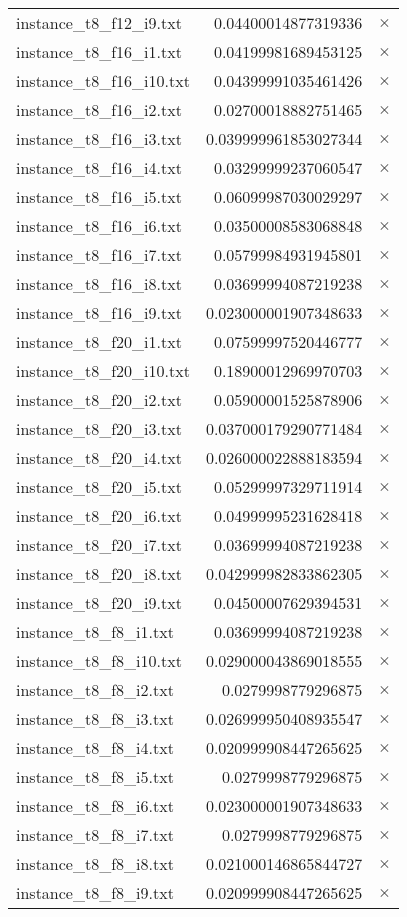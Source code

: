 \documentclass{article}
\begin{document}
\begin{center}
\begin{tabular}{|l|rr|}
instance\_t8\_f12\_i9.txt & 0.04400014877319336 & $\times$ \\
instance\_t8\_f16\_i1.txt & 0.04199981689453125 & $\times$ \\
instance\_t8\_f16\_i10.txt & 0.04399991035461426 & $\times$ \\
instance\_t8\_f16\_i2.txt & 0.02700018882751465 & $\times$ \\
instance\_t8\_f16\_i3.txt & 0.039999961853027344 & $\times$ \\
instance\_t8\_f16\_i4.txt & 0.03299999237060547 & $\times$ \\
instance\_t8\_f16\_i5.txt & 0.06099987030029297 & $\times$ \\
instance\_t8\_f16\_i6.txt & 0.03500008583068848 & $\times$ \\
instance\_t8\_f16\_i7.txt & 0.05799984931945801 & $\times$ \\
instance\_t8\_f16\_i8.txt & 0.03699994087219238 & $\times$ \\
instance\_t8\_f16\_i9.txt & 0.023000001907348633 & $\times$ \\
instance\_t8\_f20\_i1.txt & 0.07599997520446777 & $\times$ \\
instance\_t8\_f20\_i10.txt & 0.18900012969970703 & $\times$ \\
instance\_t8\_f20\_i2.txt & 0.05900001525878906 & $\times$ \\
instance\_t8\_f20\_i3.txt & 0.037000179290771484 & $\times$ \\
instance\_t8\_f20\_i4.txt & 0.026000022888183594 & $\times$ \\
instance\_t8\_f20\_i5.txt & 0.05299997329711914 & $\times$ \\
instance\_t8\_f20\_i6.txt & 0.04999995231628418 & $\times$ \\
instance\_t8\_f20\_i7.txt & 0.03699994087219238 & $\times$ \\
instance\_t8\_f20\_i8.txt & 0.042999982833862305 & $\times$ \\
instance\_t8\_f20\_i9.txt & 0.04500007629394531 & $\times$ \\
instance\_t8\_f8\_i1.txt & 0.03699994087219238 & $\times$ \\
instance\_t8\_f8\_i10.txt & 0.029000043869018555 & $\times$ \\
instance\_t8\_f8\_i2.txt & 0.0279998779296875 & $\times$ \\
instance\_t8\_f8\_i3.txt & 0.026999950408935547 & $\times$ \\
instance\_t8\_f8\_i4.txt & 0.020999908447265625 & $\times$ \\
instance\_t8\_f8\_i5.txt & 0.0279998779296875 & $\times$ \\
instance\_t8\_f8\_i6.txt & 0.023000001907348633 & $\times$ \\
instance\_t8\_f8\_i7.txt & 0.0279998779296875 & $\times$ \\
instance\_t8\_f8\_i8.txt & 0.021000146865844727 & $\times$ \\
instance\_t8\_f8\_i9.txt & 0.020999908447265625 & $\times$ \\
\hline
\end{tabular}
\end{center}
\end{document}
